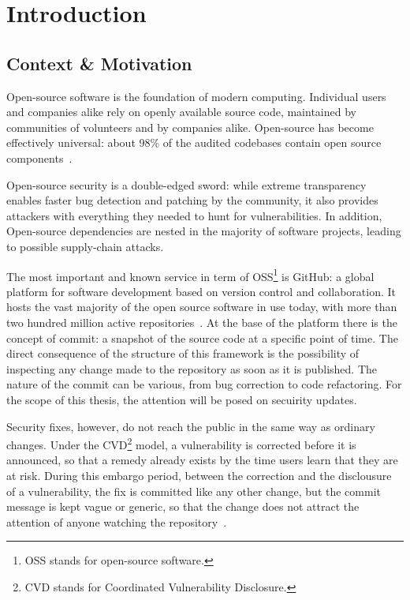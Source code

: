 \chapter{Introduction}
\label{chap:introduction}


\section[Context \& Motivation]{Context \& Motivation} %
    Open-source software is the foundation of modern computing. 
    Individual users and companies alike rely on openly available source code, maintained by
    communities of volunteers and by companies alike.
    Open-source has become effectively universal: about 98\% of the audited codebases contain open source components~\cite{ossra2026}.

    Open-source security is a double-edged sword: while extreme transparency enables faster bug detection and patching by the community,
     it also provides attackers with everything they needed to hunt for vulnerabilities.
    In addition, Open-source dependencies are nested in the majority of software projects, leading to possible supply-chain attacks.

    The most important and known service in term of OSS\footnote{OSS stands for open-source software.} is GitHub: a global platform for software development based on version control and collaboration.
    It hosts the vast majority of the open source software in use today, with more than two hundred million active repositories~\cite{ayala2025disclosures}. 
    At the base of the platform there is the concept of commit: a snapshot of the source code at a specific point of time.
    The direct consequence of the structure of this framework is the possibility of inspecting any change made to the repository as soon as it is published.
    The nature of the commit can be various, from bug correction to code refactoring. For the scope of this thesis, the attention will be posed on secuirity updates.

    Security fixes, however, do not reach the public in the same way as ordinary changes.
    Under the CVD\footnote{CVD stands for Coordinated Vulnerability Disclosure.} model, a vulnerability is corrected before it is
    announced, so that a remedy already exists by the time users learn that they are at risk.
    During this embargo period, between the correction and the disclousure of a vulnerability, the fix is committed like any other change, but the commit message is
    kept vague or generic, so that the change does not attract the attention of anyone watching the
    repository~\cite{colefunda2023}.
    

